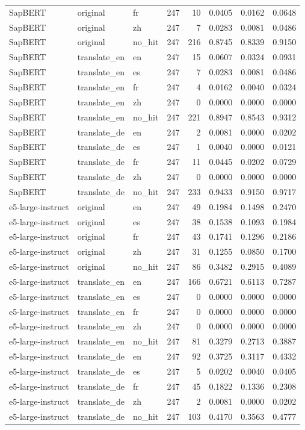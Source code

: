 \begin{tabular}{lllrrrrr}
SapBERT & original & fr & 247 & 10 & 0.0405 & 0.0162 & 0.0648 \\
SapBERT & original & zh & 247 & 7 & 0.0283 & 0.0081 & 0.0486 \\
SapBERT & original & no\_hit & 247 & 216 & 0.8745 & 0.8339 & 0.9150 \\
SapBERT & translate\_en & en & 247 & 15 & 0.0607 & 0.0324 & 0.0931 \\
SapBERT & translate\_en & es & 247 & 7 & 0.0283 & 0.0081 & 0.0486 \\
SapBERT & translate\_en & fr & 247 & 4 & 0.0162 & 0.0040 & 0.0324 \\
SapBERT & translate\_en & zh & 247 & 0 & 0.0000 & 0.0000 & 0.0000 \\
SapBERT & translate\_en & no\_hit & 247 & 221 & 0.8947 & 0.8543 & 0.9312 \\
SapBERT & translate\_de & en & 247 & 2 & 0.0081 & 0.0000 & 0.0202 \\
SapBERT & translate\_de & es & 247 & 1 & 0.0040 & 0.0000 & 0.0121 \\
SapBERT & translate\_de & fr & 247 & 11 & 0.0445 & 0.0202 & 0.0729 \\
SapBERT & translate\_de & zh & 247 & 0 & 0.0000 & 0.0000 & 0.0000 \\
SapBERT & translate\_de & no\_hit & 247 & 233 & 0.9433 & 0.9150 & 0.9717 \\
e5-large-instruct & original & en & 247 & 49 & 0.1984 & 0.1498 & 0.2470 \\
e5-large-instruct & original & es & 247 & 38 & 0.1538 & 0.1093 & 0.1984 \\
e5-large-instruct & original & fr & 247 & 43 & 0.1741 & 0.1296 & 0.2186 \\
e5-large-instruct & original & zh & 247 & 31 & 0.1255 & 0.0850 & 0.1700 \\
e5-large-instruct & original & no\_hit & 247 & 86 & 0.3482 & 0.2915 & 0.4089 \\
e5-large-instruct & translate\_en & en & 247 & 166 & 0.6721 & 0.6113 & 0.7287 \\
e5-large-instruct & translate\_en & es & 247 & 0 & 0.0000 & 0.0000 & 0.0000 \\
e5-large-instruct & translate\_en & fr & 247 & 0 & 0.0000 & 0.0000 & 0.0000 \\
e5-large-instruct & translate\_en & zh & 247 & 0 & 0.0000 & 0.0000 & 0.0000 \\
e5-large-instruct & translate\_en & no\_hit & 247 & 81 & 0.3279 & 0.2713 & 0.3887 \\
e5-large-instruct & translate\_de & en & 247 & 92 & 0.3725 & 0.3117 & 0.4332 \\
e5-large-instruct & translate\_de & es & 247 & 5 & 0.0202 & 0.0040 & 0.0405 \\
e5-large-instruct & translate\_de & fr & 247 & 45 & 0.1822 & 0.1336 & 0.2308 \\
e5-large-instruct & translate\_de & zh & 247 & 2 & 0.0081 & 0.0000 & 0.0202 \\
e5-large-instruct & translate\_de & no\_hit & 247 & 103 & 0.4170 & 0.3563 & 0.4777 \\
\bottomrule
\end{tabular}
